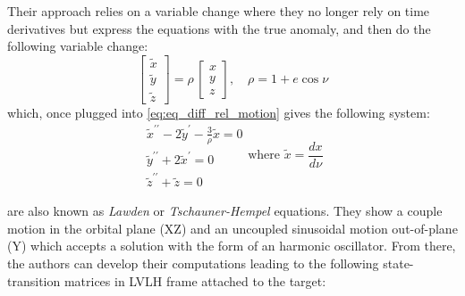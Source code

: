 Their approach relies on a variable change where they no longer rely on time derivatives but express the equations with the true anomaly, and then do the following variable change:
\begin{equation} \label{eq:ya_variable_change}
	\begin{bmatrix}
		\tilde{x}\\ 
		\tilde{y}\\ 
		\tilde{z}
	\end{bmatrix} = \rho \, \begin{bmatrix}
		x\\ 
		y\\ 
		z
	\end{bmatrix}, \quad \rho = 1+e\cos\nu
\end{equation}{}
which, once plugged into \cref{eq:eq_diff_rel_motion} gives the following system:
\begin{equation} \label{eq:ya_diff_eq_nu}
	\begin{array} { c } { \tilde { x } ^ { \prime \prime } - 2 \tilde { y } ^ { \prime } - \frac { 3 } { \rho } \tilde { x } = 0 } \\ { \tilde { y } ^ { \prime \prime } + 2 \tilde { x } ^ { \prime } = 0 } \\ { \tilde { z } ^ { \prime \prime } + \tilde { z } = 0 } \end{array} \text{where } \tilde{x} = \frac{dx}{d\nu}
\end{equation}{}

 are also known as \emph{Lawden} \citep{lawden_optimal_1963} or \emph{Tschauner-Hempel} \citep{tschauner_rendezvous_1965} equations. They show a couple motion in the orbital plane (XZ) and an uncoupled sinusoidal motion out-of-plane (Y) which accepts a solution with the form of an harmonic oscillator. From there, the authors can develop their computations leading to the following state-transition matrices in \gls{LVLH} frame attached to the target:

